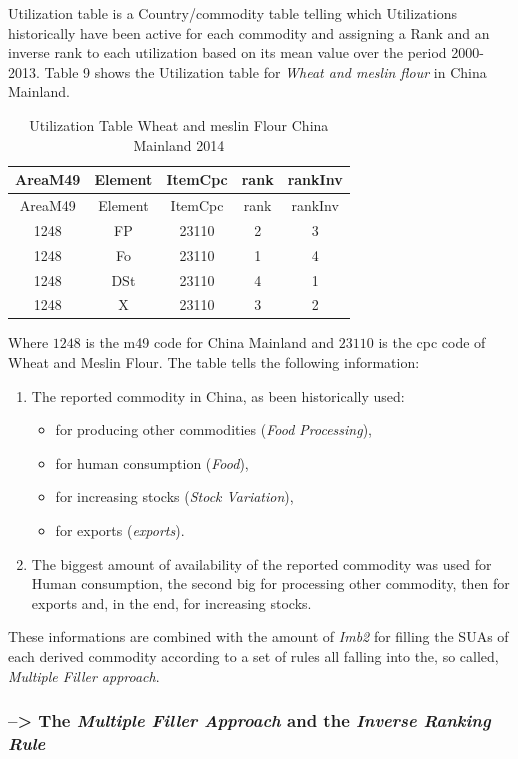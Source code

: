 \documentclass[]{article}
\providecommand{\tightlist}{%
  \setlength{\itemsep}{0pt}\setlength{\parskip}{0pt}}
\begin{document}
Utilization table is a Country/commodity table telling which
Utilizations historically have been active for each commodity and
assigning a Rank and an inverse rank to each utilization based on its
mean value over the period 2000-2013. Table 9 shows the Utilization
table for \emph{Wheat and meslin flour} in China Mainland.

\begin{longtable}[]{@{}ccccc@{}}
\caption{Utilization Table Wheat and meslin Flour China Mainland
2014}\tabularnewline
\toprule
AreaM49 & Element & ItemCpc & rank & rankInv\tabularnewline
\midrule
\endfirsthead
\toprule
AreaM49 & Element & ItemCpc & rank & rankInv\tabularnewline
\midrule
\endhead
1248 & FP & 23110 & 2 & 3\tabularnewline
1248 & Fo & 23110 & 1 & 4\tabularnewline
1248 & DSt & 23110 & 4 & 1\tabularnewline
1248 & X & 23110 & 3 & 2\tabularnewline
\bottomrule
\end{longtable}

Where \(1248\) is the m49 code for China Mainland and \(23110\) is the
cpc code of Wheat and Meslin Flour. The table tells the following
information:

\begin{enumerate}
\def\labelenumi{\arabic{enumi}.}
\tightlist
\item
  The reported commodity in China, as been historically used:

  \begin{itemize}
  \tightlist
  \item
    for producing other commodities (\emph{Food Processing}),
  \item
    for human consumption (\emph{Food}),
  \item
    for increasing stocks (\emph{Stock Variation}),
  \item
    for exports (\emph{exports}).
  \end{itemize}
\item
  The biggest amount of availability of the reported commodity was used
  for Human consumption, the second big for processing other commodity,
  then for exports and, in the end, for increasing stocks.
\end{enumerate}

These informations are combined with the amount of \emph{Imb2} for
filling the SUAs of each derived commodity according to a set of rules
all falling into the, so called, \emph{Multiple Filler approach}.

\subsubsection*{\texorpdfstring{--\textgreater{} The \emph{Multiple
Filler Approach} and the \emph{Inverse Ranking
Rule}}{--\textgreater{} The Multiple Filler Approach and the Inverse Ranking Rule}}\label{the-multiple-filler-approach-and-the-inverse-ranking-rule}
\end{document}
